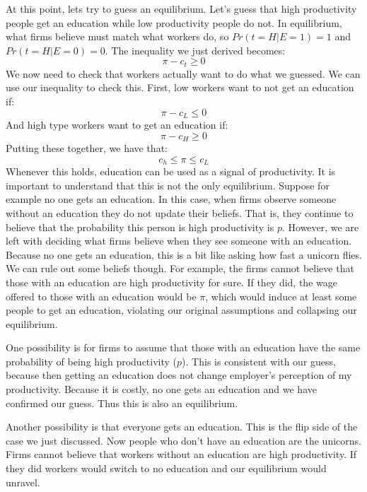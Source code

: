 \documentclass{article}
\begin{document}
At this point, lets try to guess an equilibrium. Let's guess that high productivity people get an education while low productivity people do not. In equilibrium, what firms believe must match what workers do, so $Pr(t=H|E=1)=1$ and $Pr(t=H|E=0)=0$. The inequality we just derived becomes:
\[\pi - c_t \geq 0\]
We now need to check that workers actually want to do what we guessed. We can use our inequality to check this. First, low workers want to not get an education if:
\[\pi - c_L \leq  0\]
And high type workers want to get an education if:
\[\pi - c_H \geq 0\]
Putting these together, we have that:
\[c_h \leq \pi \leq c_L\]
Whenever this holds, education can be used as a signal of productivity. It is important to understand that this is not the only equilibrium. Suppose for example no one gets an education. In this case, when firms observe someone without an education they do not update their beliefs. That is, they continue to believe that the probability this person is high productivity is $p$. However, we are left with deciding what firms believe when they see someone with an education. Because no one gets an education, this is a bit like asking how fast a unicorn flies. We can rule out some beliefs though. For example, the firms cannot believe that those with an education are high productivity for sure. If they did, the wage offered to those with an education would be $\pi$, which would induce at least some people to get an education, violating our original assumptions and collapsing our equilibrium.

One possibility is for firms to assume that those with an education have the same probability of being high productivity ($p$). This is consistent with our guess, because then getting an education does not change employer's perception of my productivity. Because it is costly, no one gets an education and we have confirmed our guess. Thus this is also an equilibrium.

Another possibility is that everyone gets an education. This is the flip side of the case we just discussed. Now people who don't have an education are the unicorns. Firms cannot believe that workers without an education are high productivity. If they did workers would switch to no education and our equilibrium would unravel.
\end{document}
